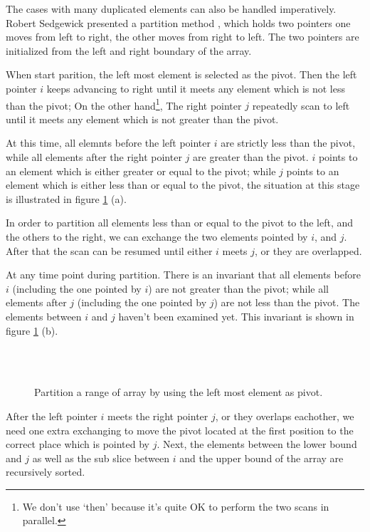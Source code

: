 \documentclass{article}
\begin{document}
The cases with many duplicated elements can also be handled imperatively. Robert Sedgewick presented a partition
method \cite{qsort-impl}, \cite{pearls}
which holds two pointers one moves from left to right, the other moves from right to left. The two pointers
are initialized from the left and right boundary of the array.

When start parition, the left most element is selected as the pivot. Then the left pointer $i$
keeps advancing to right until it meets any element which is not less than the pivot; On the other hand\footnote{We don't use `then' because it's quite OK to perform the two scans in parallel.}, The right pointer $j$ repeatedly scan to
left until it meets any element which is not greater than the pivot.

At this time, all elemnts before the left pointer $i$ are strictly less than the pivot, while all
elements after the right pointer $j$ are greater than the pivot. $i$ points to an element which is
 either greater or equal to the pivot; while $j$ points to an element which is either less than or
equal to the pivot, the situation at this stage is illustrated in figure \ref{fig:partition-2-way} (a).

In order to partition all elements less than or equal to the pivot to the left, and the others to the right,
we can exchange the two elements pointed by $i$, and $j$. After that the scan can be resumed until either
$i$ meets $j$, or they are overlapped.

At any time point during partition. There is an invariant that all elements before $i$ (including the one 
pointed by $i$) are not greater than
the pivot; while all elements after $j$ (including the one pointed by $j$) are not less than the pivot. 
The elements between $i$ and $j$ haven't been examined yet. This invariant is shown in figure \ref{fig:partition-2-way} (b).

\begin{figure}[htbp]
   \centering
    \\
    \\
   \caption{Partition a range of array by using the left most element as pivot.} 
   \label{fig:partition-2-way}
\end{figure}

After the left pointer $i$ meets the right pointer $j$, or they overlaps eachother, we need one extra exchanging
to move the pivot located at the first position to the correct place which is pointed by $j$. Next, the 
elements between the lower bound and $j$ as well as the sub slice between $i$ and the upper bound of the array
are recursively sorted.
\end{document}
